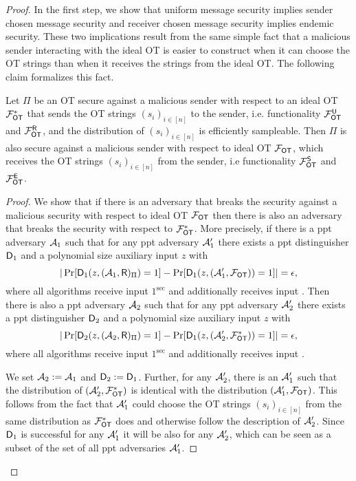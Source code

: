 
\begin{proof}
	In the first step, we show that uniform message security implies sender chosen message security and receiver chosen message security implies endemic security. These two implications result from the same simple fact that a malicious sender interacting with the ideal OT is easier to construct when it can choose the OT strings than when it receives the strings from the ideal OT. The following claim formalizes this fact. 
	\begin{claim}\label{claim:utocs}
		Let $\Pi$ be an OT secure against a malicious sender with respect to an ideal OT $\mathcal{F}_{\mathsf{OT}}^*$ that sends the OT strings $(s_i)_{i\in[n]}$ to the sender, i.e. functionality $\mathcal{F}_{\mathsf{OT}}^\mathsf{U}$ and $\mathcal{F}_{\mathsf{OT}}^{\mathsf{R}}$, and the distribution of $(s_i)_{i\in[n]}$ is efficiently sampleable. Then $\Pi$ is also secure against a malicious sender with respect to ideal OT $\mathcal{F}_{\mathsf{OT}}$, which receives the OT strings $(s_i)_{i\in[n]}$ from the sender, i.e functionality $\mathcal{F}_{\mathsf{OT}}^\mathsf{S}$ and $\mathcal{F}_{\mathsf{OT}}^\mathsf{E}$.
	\end{claim}
	
	
	\begin{proof}
		We show that if there is an adversary that breaks the security against a malicious security with respect to ideal OT $\mathcal{F}_{\mathsf{OT}}$ then there is also an adversary that breaks the security with respect to $\mathcal{F}_{\mathsf{OT}}^*$. More precisely, if there is a ppt adversary $\mathcal{A}_1$ such that for any ppt adversary $\mathcal{A}_1'$ there exists a ppt distinguisher $\mathsf D_1$ and a polynomial size auxiliary input $z$ with 
		$$
		|\Pr[\mathsf D_1(z,(\mathcal{A}_1,\mathsf{R})_{\Pi})=1] -\Pr[\mathsf D_1(z, (\mathcal{A}'_1, \mathcal{F}_{\mathsf{OT}}))=1]|=\epsilon,
		$$
		where all algorithms receive input $1^\sec$ and \rec additionally receives input \set.
		Then there is also a ppt adversary $\mathcal{A}_2$ such that for any ppt adversary $\mathcal{A}_2'$ there exists a ppt distinguisher $\mathsf D_2$ and a polynomial size auxiliary input $z$ with 
		$$
		|\Pr[\mathsf D_2(z,(\mathcal{A}_2,\mathsf{R})_{\Pi})=1] -\Pr[\mathsf D_1(z, (\mathcal{A}'_2, \mathcal{F}_{\mathsf{OT}}^*))=1]|=\epsilon,
		$$
		where all algorithms receive input $1^\sec$ and \rec additionally receives input \set.
		
		We set $\mathcal{A}_2:=\mathcal{A}_1$ and $\mathsf D_2:=\mathsf D_1$. Further, for any $\mathcal{A}_2'$, there is an $\mathcal{A}_1'$  such that the distribution of $(\mathcal{A}'_2, \mathcal{F}_{\mathsf{OT}}^*)$ is identical with the distribution $(\mathcal{A}'_1, \mathcal{F}_{\mathsf{OT}})$. This follows from the fact that  $\mathcal{A}_1'$ could choose the OT strings $(s_i)_{i\in[n]}$  from the same distribution as $\mathcal{F}_{\mathsf{OT}}^*$ does and otherwise follow the description of $\mathcal{A}_2'$. Since $\mathsf D_1$ is successful for any $\mathcal{A}_1'$ it will be also for any $\mathcal{A}_2'$, which can be seen as a subset of the set of all ppt adversaries $\mathcal{A}_1'$.
		\pe
	\end{proof}
	

\end{proof}
